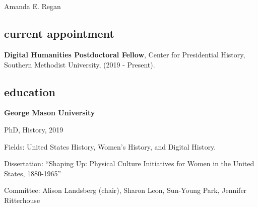 \documentclass[11pt]{article}
\begin{document}
\thispagestyle{fancy}
\fancyfoot{}
\fancyhead{}
\renewcommand{\headrulewidth}{0pt}

\hfill\hfill\hfill
\hfill\hfill\hfill
\hfill\hfill\hfill
\hfill\hfill\hfill
\begin{minipage}[t]{1.6in}
   \\
   \\
\end{minipage}
\hfill
\begin{minipage}[t]{1.9in}
\end{minipage}


\vspace{0.1in}

{\Large Amanda E. Regan}\\[-0.1in]

\subsection{current appointment}\label{current-position}
\hfill\begin{minipage}{6.25in}

  \textbf{Digital Humanities Postdoctoral Fellow}, Center for Presidential History, Southern Methodist University, (2019 - Present).
  \vspace{0.10in}

\end{minipage}

\subsection{education}\label{education}

\textbf{George Mason University}

\hfill\begin{minipage}{6.25in}

  PhD, History, 2019
  \vspace{0.10in}

  Fields: United States History, Women's History, and Digital History.

  \vspace{0.10in}

  Dissertation: ``Shaping Up: Physical Culture Initiatives for Women in the United States, 1880-1965''

  Committee: Alison Landsberg (chair), Sharon Leon, Sun-Young Park, Jennifer Ritterhouse

\end{minipage}
\end{document}

